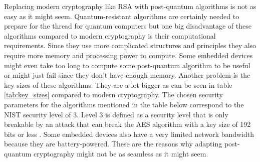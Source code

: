 Replacing modern cryptography like RSA with post-quantum algorithms is not as easy as it might seem. Quantum-resistant algorithms are certainly needed to prepare for the thread for quantum computers but one big disadvantage of these algorithms compared to modern cryptography is their computational requirements. Since they use more complicated structures and principles they also require more memory and processing power to compute. Some embedded devices might even take too long to compute some post-quantum algorithm to be useful or might just fail since they don't have enough memory. Another problem is the key sizes of these algorithms. They are a lot bigger as can be seen in table \ref{tab:key_sizes} compared to modern cryptography. The chosen security parameters for the algorithms mentioned in the table below correspond to the NIST security level of 3. Level 3 is defined as a security level that is only breakable by an attack that can break the AES algorithm with a key size of 192 bits or less \cite{8lV5dQrQyshiCp3i}. Some embedded devices also have a very limited network bandwidth because they are battery-powered. These are the reasons why adapting post-quantum cryptography might not be as seamless as it might seem.

